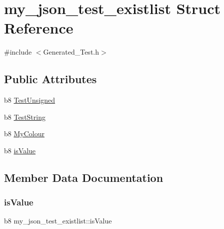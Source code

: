 \hypertarget{structmy__json__test__existlist}{}\section{my\+\_\+json\+\_\+test\+\_\+existlist Struct Reference}
\label{structmy__json__test__existlist}


{\ttfamily \#include $<$Generated\+\_\+\+Test.\+h$>$}

\subsection*{Public Attributes}
\begin{DoxyCompactItemize}
\item 
b8 \hyperlink{structmy__json__test__existlist_abcc3320a088be44f3780f7768da67efa}{Test\+Unsigned}
\item 
b8 \hyperlink{structmy__json__test__existlist_ad1bf35a0d6153e177322567228ae0203}{Test\+String}
\item 
b8 \hyperlink{structmy__json__test__existlist_adc7bd401b4e560999733be88e43b5b7f}{My\+Colour}
\item 
b8 \hyperlink{structmy__json__test__existlist_ad8b82af159a6dd0709800ca082156caf}{is\+Value}
\end{DoxyCompactItemize}


\subsection{Member Data Documentation}
\mbox{\label{structmy__json__test__existlist_ad8b82af159a6dd0709800ca082156caf}} 
\subsubsection{\texorpdfstring{is\+Value}{isValue}}
{\footnotesize\ttfamily b8 my\+\_\+json\+\_\+test\+\_\+existlist\+::is\+Value}

\mbox{\label{structmy__json__test__existlist_adc7bd401b4e560999733be88e43b5b7f}} 
